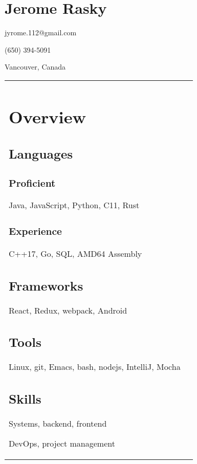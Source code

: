 \documentclass[letterpaper]{article}
\newlength{\leftcol}
\newlength{\rightcol}
\begin{document}
\bodyfont
\large
{}

\section*{\Huge Jerome Rasky}

jyrome.112@gmail.com

(650) 394-5091

Vancouver, Canada

\begin{tabularx}{\textwidth}{@{}p{\leftcol} p{\rightcol}}
\vspace*{0.5pt}
\section*{Overview}
\subsection*{Languages}

\subsubsection*{Proficient}

Java, JavaScript, Python, C11, Rust

\subsubsection*{Experience}

C++17, Go, SQL, AMD64 Assembly

\subsection*{Frameworks}

React, Redux, webpack, Android

\subsection*{Tools}

Linux, git, Emacs, bash, nodejs, IntelliJ, Mocha

\subsection*{Skills}

Systems, backend, frontend

DevOps, project management


\end{tabularx}
\end{document}
